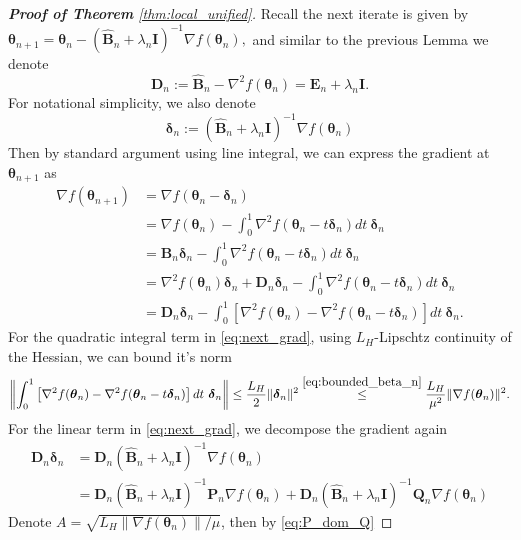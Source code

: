 \documentclass[11pt]{amsart}
\theoremstyle{plain}
\theoremstyle{definition}
\theoremstyle{remark}
\def\D{\mathbf{D}}
\def\bQ{\mathbf{Q}}
\def\bE{\mathbf{E}}
\def\bP{\mathbf{P}}
\def\B{\mathbf{B}}
\def\param{\boldsymbol{\theta}}
\begin{document}
\begin{proof}[\textbf{Proof of Theorem} \ref{thm:local_unified}]
    Recall the next iterate is given by $ \param_{n+1}=\param_n-(\hat{\B}_n+\lambda_n\mathbf{I})^{-1}\nabla f(\param_n),$ and similar to the previous Lemma we denote
    \[
    \D_n:=\hat{\B}_n-\nabla^2f(\param_n)=\bE_n+\lambda_n\mathbf{I}.
    \]
    For notational simplicity, we also denote 
    \[
    \boldsymbol{\delta}_n:=(\hat{\B}_n+\lambda_n\mathbf{I})^{-1}\nabla f(\param_n)
    \]
    Then by standard argument using line integral, %
    we can express the gradient at $\param_{n+1}$ as 
    \begin{align}\label{eq:next_grad}
        \nabla f(\param_{n+1})&=\nabla f(\param_n-\boldsymbol{\delta}_n)\nonumber\\
        &=\nabla f(\param_n)-\int_{0}^{1}\nabla^2f(\param_n-t\boldsymbol{\delta}_n)dt\ \boldsymbol{\delta}_n\nonumber\\
        &=\B_n\boldsymbol{\delta}_n-\int_{0}^{1}\nabla^2f(\param_n-t\boldsymbol{\delta}_n)dt\ \boldsymbol{\delta}_n\nonumber\\
        &= \nabla^2f(\param_n)\boldsymbol{\delta}_n+\D_n\boldsymbol{\delta}_n-\int_{0}^{1}\nabla^2f(\param_n-t\boldsymbol{\delta}_n)dt\ \boldsymbol{\delta}_n\nonumber\\
        &=\D_n\boldsymbol{\delta}_n
        -\int_{0}^{1}\left[\nabla^2f(\param_n)-\nabla^2f(\param_n-t\boldsymbol{\delta}_n)\right]dt\ \boldsymbol{\delta}_n.
    \end{align}
    For the quadratic integral term in \eqref{eq:next_grad}, using $L_H$-Lipschtz continuity of the Hessian, we can bound it's norm 
    \begin{align*}
    \left\|\int_{0}^{1}\left[\nabla^2f(\param_n)-\nabla^2f(\param_n-t\boldsymbol{\delta}_n)\right]dt\ \boldsymbol{\delta}_n\right\| \leq \frac{L_H}{2}\|\boldsymbol{\delta}_n\|^2 \overset{\eqref{eq:bounded_beta_n}}{\leq} \frac{L_H}{\mu^2}\|\nabla f(\param_n)\|^2.
    \end{align*}
    For the linear term in \eqref{eq:next_grad}, we decompose the gradient again
    \begin{align}\label{eq:DB}
\D_n\boldsymbol{\delta}_n&=\D_n(\hat{\B}_n+\lambda_n\mathbf{I})^{-1}\nabla f(\param_{n})\nonumber\\
&=\D_n(\hat{\B}_n+\lambda_n\mathbf{I})^{-1}\bP_n\nabla f(\param_{n})+
\D_n(\hat{\B}_n+\lambda_n\mathbf{I})^{-1}\bQ_n\nabla f(\param_n)
    \end{align}
    Denote $A=\sqrt{L_H\|\nabla f(\param_n)\|/\mu}$, then by \eqref{eq:P_dom_Q}

\end{proof}
\end{document}
